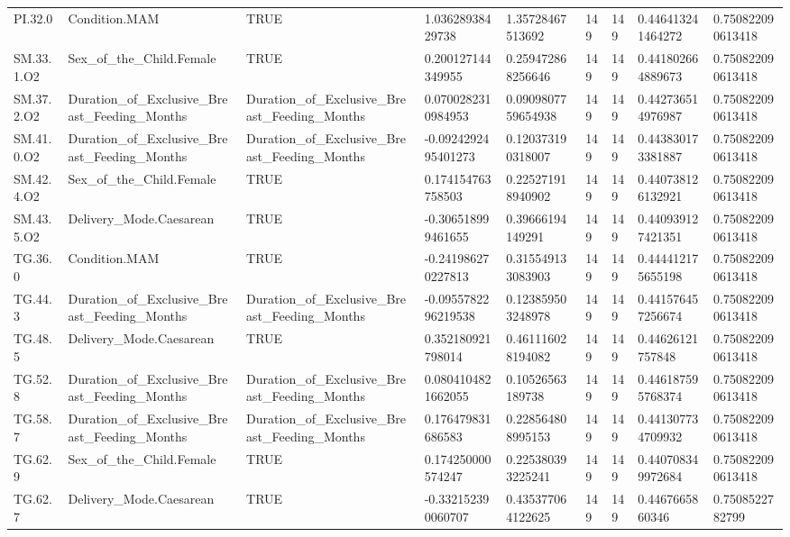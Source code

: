 \begin{longtable}{lllllllll}
PI.32.0 & Condition.MAM & TRUE & 1.03628938429738 & 1.35728467513692 & 149 & 149 & 0.446413241464272 & 0.750822090613418 \\
SM.33.1.O2 & Sex\_of\_the\_Child.Female & TRUE & 0.200127144349955 & 0.259472868256646 & 149 & 149 & 0.441802664889673 & 0.750822090613418 \\
SM.37.2.O2 & Duration\_of\_Exclusive\_Breast\_Feeding\_Months & Duration\_of\_Exclusive\_Breast\_Feeding\_Months & 0.0700282310984953 & 0.0909807759654938 & 149 & 149 & 0.442736514976987 & 0.750822090613418 \\
SM.41.0.O2 & Duration\_of\_Exclusive\_Breast\_Feeding\_Months & Duration\_of\_Exclusive\_Breast\_Feeding\_Months & -0.0924292495401273 & 0.120373190318007 & 149 & 149 & 0.443830173381887 & 0.750822090613418 \\
SM.42.4.O2 & Sex\_of\_the\_Child.Female & TRUE & 0.174154763758503 & 0.225271918940902 & 149 & 149 & 0.440738126132921 & 0.750822090613418 \\
SM.43.5.O2 & Delivery\_Mode.Caesarean & TRUE & -0.306518999461655 & 0.39666194149291 & 149 & 149 & 0.440939127421351 & 0.750822090613418 \\
TG.36.0 & Condition.MAM & TRUE & -0.241986270227813 & 0.315549133083903 & 149 & 149 & 0.444412175655198 & 0.750822090613418 \\
TG.44.3 & Duration\_of\_Exclusive\_Breast\_Feeding\_Months & Duration\_of\_Exclusive\_Breast\_Feeding\_Months & -0.0955782296219538 & 0.123859503248978 & 149 & 149 & 0.441576457256674 & 0.750822090613418 \\
TG.48.5 & Delivery\_Mode.Caesarean & TRUE & 0.352180921798014 & 0.461116028194082 & 149 & 149 & 0.44626121757848 & 0.750822090613418 \\
TG.52.8 & Duration\_of\_Exclusive\_Breast\_Feeding\_Months & Duration\_of\_Exclusive\_Breast\_Feeding\_Months & 0.0804104821662055 & 0.10526563189738 & 149 & 149 & 0.446187595768374 & 0.750822090613418 \\
TG.58.7 & Duration\_of\_Exclusive\_Breast\_Feeding\_Months & Duration\_of\_Exclusive\_Breast\_Feeding\_Months & 0.176479831686583 & 0.228564808995153 & 149 & 149 & 0.441307734709932 & 0.750822090613418 \\
TG.62.9 & Sex\_of\_the\_Child.Female & TRUE & 0.174250000574247 & 0.225380393225241 & 149 & 149 & 0.440708349972684 & 0.750822090613418 \\
TG.62.7 & Delivery\_Mode.Caesarean & TRUE & -0.332152390060707 & 0.435377064122625 & 149 & 149 & 0.4467665860346 & 0.7508522782799 \\

\end{longtable}
